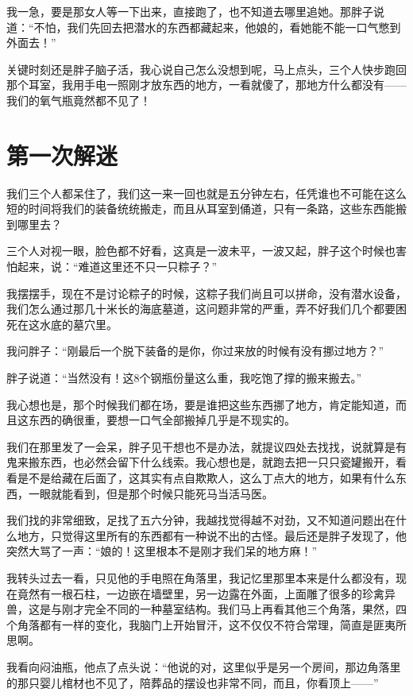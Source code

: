 我一急，要是那女人等一下出来，直接跑了，也不知道去哪里追她。那胖子说道：“不怕，我们先回去把潜水的东西都藏起来，他娘的，看她能不能一口气憋到外面去！”

关键时刻还是胖子脑子活，我心说自己怎么没想到呢，马上点头，三个人快步跑回那个耳室，我用手电一照刚才放东西的地方，一看就傻了，那地方什么都没有——我们的氧气瓶竟然都不见了！

\chapter{第一次解迷}

我们三个人都呆住了，我们这一来一回也就是五分钟左右，任凭谁也不可能在这么短的时间将我们的装备统统搬走，而且从耳室到俑道，只有一条路，这些东西能搬到哪里去？

三个人对视一眼，脸色都不好看，这真是一波未平，一波又起，胖子这个时候也害怕起来，说：“难道这里还不只一只粽子？”

我摆摆手，现在不是讨论粽子的时候，这粽子我们尚且可以拼命，没有潜水设备，我们怎么通过那几十米长的海底墓道，这问题非常的严重，弄不好我们几个都要困死在这水底的墓穴里。

我问胖子：“刚最后一个脱下装备的是你，你过来放的时候有没有挪过地方？”

胖子说道：“当然没有！这8个钢瓶份量这么重，我吃饱了撑的搬来搬去。”

我心想也是，那个时候我们都在场，要是谁把这些东西挪了地方，肯定能知道，而且这东西的确很重，要想一口气全部搬掉几乎是不现实的。

我们在那里发了一会呆，胖子见干想也不是办法，就提议四处去找找，说就算是有鬼来搬东西，也必然会留下什么线索。我心想也是，就跑去把一只只瓷罐搬开，看看是不是给藏在后面了，这其实有点自欺欺人，这么丁点大的地方，如果有什么东西，一眼就能看到，但是那个时候只能死马当活马医。

我们找的非常细致，足找了五六分钟，我越找觉得越不对劲，又不知道问题出在什么地方，只觉得这里所有的东西都有一种说不出的古怪。最后还是胖子发现了，他突然大骂了一声：“娘的！这里根本不是刚才我们呆的地方麻！”

我转头过去一看，只见他的手电照在角落里，我记忆里那里本来是什么都没有，现在竟然有一根石柱，一边嵌在墙壁里，另一边露在外面，上面雕了很多的珍禽异兽，这是与刚才完全不同的一种墓室结构。我们马上再看其他三个角落，果然，四个角落都有一样的变化，我脑门上开始冒汗，这不仅仅不符合常理，简直是匪夷所思啊。

我看向闷油瓶，他点了点头说：“他说的对，这里似乎是另一个房间，那边角落里的那只婴儿棺材也不见了，陪葬品的摆设也非常不同，而且，你看顶上——”

